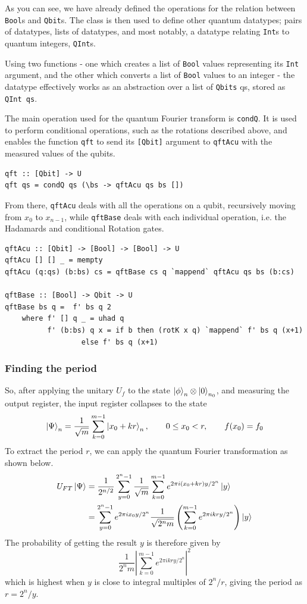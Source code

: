 \documentclass[a4paper,10pt, titlepage, twoside]{article}
\begin{document}
As you can see, we have already defined the operations for the relation between \texttt{Bool}s and \texttt{Qbit}s. The class is then used to define other quantum datatypes; pairs of datatypes, lists of datatypes, and most notably, a datatype relating \texttt{Int}s to quantum integers, \texttt{QInt}s.\par
Using two functions - one which creates a list of \texttt{Bool} values representing its \texttt{Int} argument, and the other which converts a list of \texttt{Bool} values to an integer - the datatype effectively works as an abstraction over a list of \texttt{Qbits} qs, stored as \texttt{QInt qs}.\par
The main operation used for the quantum Fourier transform is \texttt{condQ}. It  is used to perform conditional operations, such as the rotations described above, and enables the function \texttt{qft} to send its \texttt{[Qbit]} argument to \texttt{qftAcu} with the measured values of the qubits.\par
\begin{verbatim}
qft :: [Qbit] -> U
qft qs = condQ qs (\bs -> qftAcu qs bs [])
\end{verbatim}
From there, \texttt{qftAcu} deals with all the operations on a qubit, recursively moving from $x_0$ to $x_{n-1}$, while \texttt{qftBase} deals with each individual operation, i.e. the Hadamards and conditional Rotation gates.
\begin{verbatim}
qftAcu :: [Qbit] -> [Bool] -> [Bool] -> U
qftAcu [] [] _ = mempty
qftAcu (q:qs) (b:bs) cs = qftBase cs q `mappend` qftAcu qs bs (b:cs)

qftBase :: [Bool] -> Qbit -> U
qftBase bs q =  f' bs q 2
    where f' [] q _ = uhad q
          f' (b:bs) q x = if b then (rotK x q) `mappend` f' bs q (x+1)
                  else f' bs q (x+1)
\end{verbatim}

\subsubsection{Finding the period}
So, after applying the unitary $U_f$ to the state $\ket \phi _n \otimes \ket 0 _{n_0}$, and measuring the output register, the input register collapses to the state
$$\ket \Psi _n = \frac{1}{\sqrt m} \sum _{k=0}^{m-1} \ket{x_0 + kr}_n, \qquad  0 \leq x_0 < r, \qquad f(x_0) = f_0 $$
To extract the period $r$, we can apply the quantum Fourier transformation as shown below.
\begin{align*}
    U_{FT}\ket \Psi &= \frac{1}{2^{n/2}}\sum_{y=0}^{2^n-1}\frac{1}{\sqrt m}\sum_{k=0}^{m-1}e^{2\pi i(x_0 + kr)y/2^n} \ket y \\
    & = \sum_{y=0}^{2^n-1}e^{2\pi i x_0y/2^n} \frac{1}{\sqrt{2^nm}}\left(\sum_{k=0}^{m-1}e^{2\pi i kry/2^n}\right) \ket y
\end{align*}
The probability of getting the result $y$ is therefore given by
$$\frac{1}{2^nm}\left| \sum_{k=0}^{m-1}e^{2\pi i kry/2^n}\right|^2$$
which is highest when $y$ is close to integral multiples of $2^n/r$, giving the period as $r = 2^n / y$.
\end{document}
